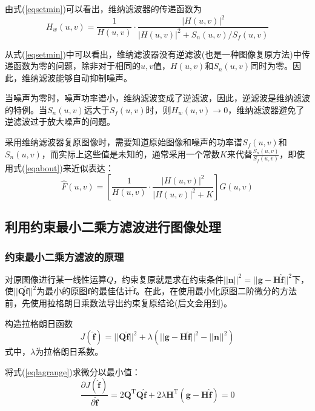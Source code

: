 \documentclass[UTF8]{ctexart}
\begin{document}
    由式(\ref{eqsetmin})可以看出，维纳滤波器的传递函数为
    \begin{equation}
        H_w(u,v)=\frac{1}{H(u,v)}\cdot\frac{|H(u,v)|^2}{|H(u,v)|^2+S_n(u,v)/S_f(u,v)}
    \end{equation}

    从式(\ref{eqsetmin})中可以看出，维纳滤波器没有逆滤波(也是一种图像复原方法)中传递函数为零的问题，除非对于相同的$u,v$值，$H(u,v)$和$S_n(u,v)$同时为零。因此，维纳滤波能够自动抑制噪声。

    当噪声为零时，噪声功率谱小，维纳滤波变成了逆滤波，因此，逆滤波是维纳滤波的特例。当$S_n(u,v)$远大于$S_f(u,v)$时，则$H_w(u,v) \to 0$，维纳滤波器避免了逆滤波过于放大噪声的问题。

    采用维纳滤波器复原图像时，需要知道原始图像和噪声的功率谱$S_f(u,v)$和$S_n(u,v)$，而实际上这些值是未知的，通常采用一个常数$K$来代替$\displaystyle\frac{S_n(u,v)}{S_f(u,v)}$，即使用式(\ref{eqabout})来近似表达：
    \begin{equation}\label{eqabout}
        \hat{F}(u,v)=\left[\frac{1}{H(u,v)}\cdot\frac{|H(u,v)|^2}{|H(u,v)|^2+K}\right]G(u,v)
    \end{equation}

    \subsection{利用约束最小二乘方滤波进行图像处理}
    \subsubsection{约束最小二乘方滤波的原理}
    对原图像进行某一线性运算$Q$，约束复原就是求在约束条件$||\pmb{n}||^2=||\pmb{g}-\pmb{H}\hat{\pmb{f}}||^2$下，使$||\pmb{Q}\hat{\pmb{f}}||^2$为最小的原图$\pmb{f}$的最佳估计$\hat{\pmb{f}}$。在此，在使用最小化原图二阶微分的方法前，先使用拉格朗日乘数法导出约束复原结论(后文会用到)。

    构造拉格朗日函数
    \begin{equation}\label{eqlagrange}
        J(\hat{\pmb{f}})=||\pmb{Q}\hat{\pmb{f}}||^2+\lambda\left(||\pmb{g}-\pmb{H}\hat{\pmb{f}}||^2-||\pmb{n}||^2\right)
    \end{equation}
    式中，$\lambda$为拉格朗日系数。

    将式(\ref{eqlagrange})求微分以最小值：
    \begin{equation}
        \frac{\partial J\left(\hat{\pmb{f}}\right)}{\partial \hat{\pmb{f}}}=2\pmb{Q}^{\mathrm{T}}\pmb{Q}\hat{\pmb{f}}+2\lambda\pmb{H}^{\mathrm{T}}\left(\pmb{g}-\pmb{H}\hat{\pmb{f}}\right)=0
    \end{equation}
\end{document}
